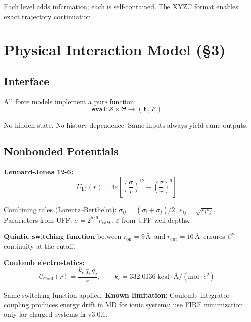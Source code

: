 \documentclass[11pt, a4paper]{article}
\begin{document}
Each level adds information; each is self-contained.  The XYZC format enables exact trajectory continuation.


\section{Physical Interaction Model (\S3)}

\subsection{Interface}

All force models implement a pure function:
\begin{equation}
\texttt{eval}: \mathcal{S} \times \Theta \to (\mathbf{F},\, \mathcal{E})
\end{equation}

No hidden state.  No history dependence.  Same inputs always yield same outputs.

\subsection{Nonbonded Potentials}

\textbf{Lennard-Jones 12-6:}
\begin{equation}
U_\text{LJ}(r) = 4\varepsilon\left[\left(\frac{\sigma}{r}\right)^{12} - \left(\frac{\sigma}{r}\right)^6\right]
\end{equation}

Combining rules (Lorentz--Berthelot):
$\sigma_{ij} = (\sigma_i + \sigma_j)/2$, \;
$\varepsilon_{ij} = \sqrt{\varepsilon_i \varepsilon_j}$.
Parameters from UFF: $\sigma = 2^{5/6} r_\text{vdW}$, $\varepsilon$ from UFF well depths.

\textbf{Quintic switching function} between $r_\text{on} = 9$\,\AA\ and $r_\text{cut} = 10$\,\AA\ ensures $C^2$ continuity at the cutoff.

\textbf{Coulomb electrostatics:}
\begin{equation}
U_\text{Coul}(r) = \frac{k_e\, q_i\, q_j}{r}, \qquad k_e = 332.0636\;\text{kcal}\cdot\text{\AA}/(\text{mol}\cdot e^2)
\end{equation}

Same switching function applied.  \textbf{Known limitation:} Coulomb--integrator coupling produces energy drift in MD for ionic systems; use FIRE minimization only for charged systems in v3.0.0.
\end{document}
